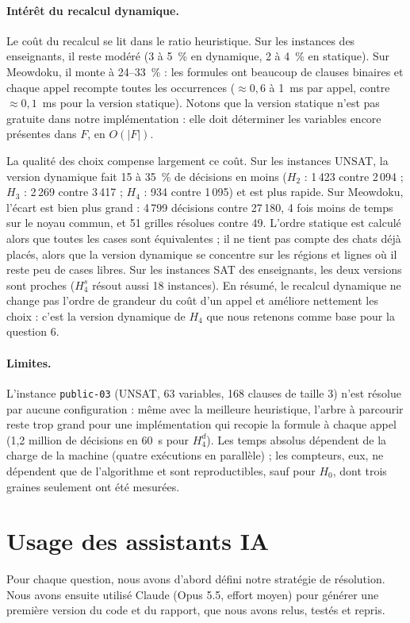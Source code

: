 \documentclass[11pt,a4paper]{article}
\begin{document}
\paragraph{Intérêt du recalcul dynamique.} Le coût du recalcul se lit dans le ratio
heuristique. Sur les instances des enseignants, il reste modéré (3 à 5~\% en dynamique, 2 à
4~\% en statique). Sur Meowdoku, il monte à 24--33~\% : les formules ont beaucoup de clauses
binaires et chaque appel recompte toutes les occurrences ($\approx 0{,}6$ à 1~ms par appel,
contre $\approx 0{,}1$~ms pour la version statique). Notons que la version statique n'est pas
gratuite dans notre implémentation : elle doit déterminer les variables encore présentes dans
$F$, en $O(|F|)$.

La qualité des choix compense largement ce coût. Sur les instances UNSAT, la version dynamique
fait 15 à 35~\% de décisions en moins ($H_2$ : 1\,423 contre 2\,094 ; $H_3$ : 2\,269 contre
3\,417 ; $H_4$ : 934 contre 1\,095) et est plus rapide. Sur Meowdoku, l'écart est bien plus
grand : 4\,799 décisions contre 27\,180, 4 fois moins de temps sur le noyau commun, et 51 grilles
résolues contre 49. L'ordre statique est calculé alors que toutes les cases sont équivalentes ;
il ne tient pas compte des chats déjà placés, alors que la version dynamique se concentre sur
les régions et lignes où il reste peu de cases libres. Sur les instances SAT des enseignants,
les deux versions sont proches ($H_4^s$ résout aussi 18 instances). En résumé, le recalcul
dynamique ne change pas l'ordre de grandeur du coût d'un appel et améliore nettement les
choix : c'est la version dynamique de $H_4$ que nous retenons comme base pour la question 6.

\paragraph{Limites.} L'instance \texttt{public-03} (UNSAT, 63 variables, 168 clauses de taille
3) n'est résolue par aucune configuration : même avec la meilleure heuristique, l'arbre à
parcourir reste trop grand pour une implémentation qui recopie la formule à chaque appel
(1,2 million de décisions en 60~s pour $H_4^d$). Les temps absolus dépendent de la charge de la
machine (quatre exécutions en parallèle) ; les compteurs, eux, ne dépendent que de l'algorithme
et sont reproductibles, sauf pour $H_0$, dont trois graines seulement ont été mesurées.

\section*{Usage des assistants IA}
Pour chaque question, nous avons d'abord défini notre stratégie de résolution. Nous avons ensuite
utilisé Claude (Opus 5.5, effort moyen) pour générer une première version du code et du rapport,
que nous avons relus, testés et repris.
\end{document}
